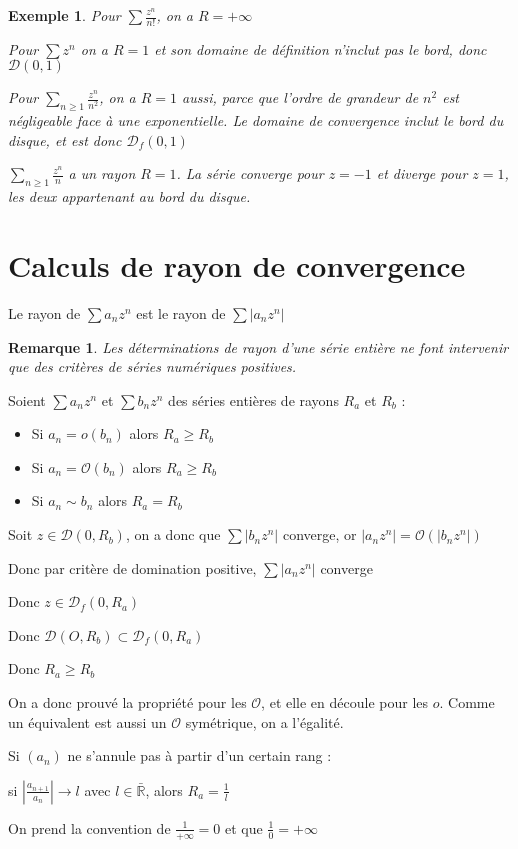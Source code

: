 \documentclass[a4paper,12pt]{book}
\newcommand{\Thr}[2]{\begin{tcolorbox}[sharp corners, colback=white,colframe=red!90!black!75, title=Théorème : #1]#2\end{tcolorbox}}
\newcommand{\Prop}[2]{\begin{tcolorbox}[sharp corners, colback=white,colframe=red!90!black!75, title=Proposition : #1]#2\end{tcolorbox}}
\newcommand{\Pre}[1]{\begin{tcolorbox}[sharp corners, colback=white,colframe=green!60!green!30!black!75, title=Preuve]#1\end{tcolorbox}}
\newtheorem{Exe}{Exemple}[section]
\newtheorem{Rem}{Remarque}[section]
\def\R{\mathbb{R}}
\begin{document}
\begin{Exe}
Pour $\sum\frac{z^n}{n!}$, on a $R=+\infty$ \par Pour $\sum z^n$ on a $R=1$ et son domaine de définition n'inclut pas le bord, donc $\mathcal{D}(0,1)$ \par Pour $\sum\limits_{n\geq 1}\frac{z^n}{n^2}$, on a $R=1$ aussi, parce que l'ordre de grandeur de $n^2$ est négligeable face à une exponentielle. Le domaine de convergence inclut le bord du disque, et est donc $\mathcal{D}_f(0,1)$  \par $\sum\limits_{n\geq 1}\frac{z^n}{n}$ a un rayon $R=1$. La série converge pour $z=-1$ et diverge pour $z=1$, les deux appartenant au bord du disque.
\end{Exe}

\section{Calculs de rayon de convergence}
\Prop{}{Le rayon de $\sum a_nz^n$ est le rayon de $\sum \vert a_n z^n\vert$}
\begin{Rem}
Les déterminations de rayon d'une série entière ne font intervenir que des critères de séries numériques positives.
\end{Rem}
\Prop{Relations de comparaison}{Soient $\sum a_nz^n$ et $\sum b_nz^n$ des séries entières de rayons $R_a$ et $R_b$ :\begin{itemize}
\item Si $a_n = o(b_n)$ alors $R_a\geq R_b$
\item Si $a_n = \mathcal{O}(b_n)$ alors $R_a\geq R_b$
\item Si $a_n\sim b_n$ alors $R_a=R_b$
\end{itemize}}
\Pre{Soit $z\in\mathcal{D}(0,R_b)$, on a donc que $\sum \vert b_nz^n\vert$ converge, or $\vert a_nz^n\vert=\mathcal{O}(\vert b_nz^n\vert)$ \par Donc par critère de domination positive, $\sum\vert a_nz^n\vert$ converge \par Donc $z\in\mathcal{D}_f(0,R_a)$ \par Donc $\mathcal{D}(O,R_b)\subset \mathcal{D}_f(0,R_a)$ \par Donc $R_a\geq R_b$
\par On a donc prouvé la propriété pour les $\mathcal{O}$, et elle en découle pour les $o$. Comme un équivalent est aussi un $\mathcal{O}$ symétrique, on a l'égalité.}
\Thr{Critère de D'Alembert}{Si $(a_n)$ ne s'annule pas à partir d'un certain rang : \par si $\left\vert\frac{a_{n+1}}{a_n}\right\vert\to l$ avec $l\in\bar{\R}$, alors $R_a = \frac{1}{l}$
\par On prend la convention de $\frac{1}{+\infty}=0$ et que $\frac{1}{0}=+\infty$}
\end{document}
